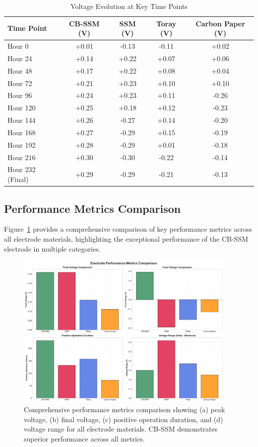 \documentclass[12pt,a4paper]{article}
\begin{document}
\begin{table}[H]
\centering
\caption{Voltage Evolution at Key Time Points}
\label{tab:voltage_evolution}
\begin{tabular}{@{}lcccc@{}}
\toprule
\textbf{Time Point} & \textbf{CB-SSM (\si{\volt})} & \textbf{SSM (\si{\volt})} & \textbf{Toray (\si{\volt})} & \textbf{Carbon Paper (\si{\volt})} \\
\midrule
Hour 0 & +0.01 & -0.13 & -0.11 & +0.02 \\
Hour 24 & +0.14 & +0.22 & +0.07 & +0.06 \\
Hour 48 & +0.17 & +0.22 & +0.08 & +0.04 \\
Hour 72 & +0.21 & +0.23 & +0.10 & +0.10 \\
Hour 96 & +0.24 & +0.23 & +0.11 & -0.26 \\
Hour 120 & +0.25 & +0.18 & +0.12 & -0.23 \\
Hour 144 & +0.26 & -0.27 & +0.14 & -0.20 \\
Hour 168 & +0.27 & -0.29 & +0.15 & -0.19 \\
Hour 192 & +0.28 & -0.29 & +0.01 & -0.18 \\
Hour 216 & +0.30 & -0.30 & -0.22 & -0.14 \\
Hour 232 (Final) & +0.29 & -0.29 & -0.21 & -0.13 \\
\bottomrule
\end{tabular}
\end{table}

\subsection{Performance Metrics Comparison}

Figure~\ref{fig:performance_comparison} provides a comprehensive comparison of key performance metrics across all electrode materials, highlighting the exceptional performance of the CB-SSM electrode in multiple categories.

\begin{figure}[H]
\centering
\includegraphics[width=0.95\textwidth]{performance_comparison.pdf}
\caption{Comprehensive performance metrics comparison showing (a) peak voltage, (b) final voltage, (c) positive operation duration, and (d) voltage range for all electrode materials. CB-SSM demonstrates superior performance across all metrics.}
\label{fig:performance_comparison}
\end{figure}
\end{document}
